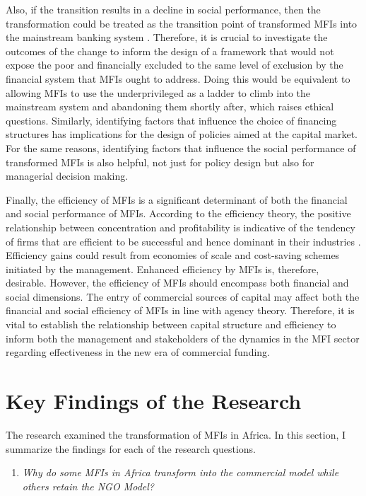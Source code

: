\documentclass[a4paper, nobind]{templates/ociamthesis}
\providecommand{\tightlist}{%
  \setlength{\itemsep}{0pt}\setlength{\parskip}{0pt}}
\begin{document}
Also, if the transition results in a decline in social performance, then the transformation could be treated as the transition point of transformed MFIs into the mainstream banking system \autocite{kent2013bankers}. Therefore, it is crucial to investigate the outcomes of the change to inform the design of a framework that would not expose the poor and financially excluded to the same level of exclusion by the financial system that MFIs ought to address. Doing this would be equivalent to allowing MFIs to use the underprivileged as a ladder to climb into the mainstream system and abandoning them shortly after, which raises ethical questions. Similarly, identifying factors that influence the choice of financing structures has implications for the design of policies aimed at the capital market. For the same reasons, identifying factors that influence the social performance of transformed MFIs is also helpful, not just for policy design but also for managerial decision making.

Finally, the efficiency of MFIs is a significant determinant of both the financial and social performance of MFIs. According to the efficiency theory, the positive relationship between concentration and profitability is indicative of the tendency of firms that are efficient to be successful and hence dominant in their industries \autocite{lipczynski2005industrial}. Efficiency gains could result from economies of scale and cost-saving schemes initiated by the management. Enhanced efficiency by MFIs is, therefore, desirable. However, the efficiency of MFIs should encompass both financial and social dimensions. The entry of commercial sources of capital may affect both the financial and social efficiency of MFIs in line with agency theory. Therefore, it is vital to establish the relationship between capital structure and efficiency to inform both the management and stakeholders of the dynamics in the MFI sector regarding effectiveness in the new era of commercial funding.

\hypertarget{key-findings-of-the-research}{%
\section{Key Findings of the Research}\label{key-findings-of-the-research}}

The research examined the transformation of MFIs in Africa. In this section, I summarize the findings for each of the research questions.

\begin{enumerate}
\def\labelenumi{\arabic{enumi}.}
\tightlist
\item
  \emph{Why do some MFIs in Africa transform into the commercial model while others retain the NGO Model?}
\end{enumerate}
\end{document}
